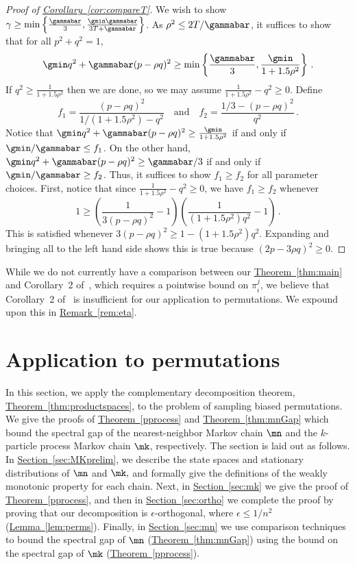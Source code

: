 \documentclass[11pt]{article}
\providecommand{\expref}[2]{\texorpdfstring{\hyperref[#2]{#1~\ref{#2}}}{#1~\ref{#2}}}
\begin{document}
%
%
%
\begin{proof}[Proof of \expref{Corollary}{cor:compareT}]
We wish to show $\gamma\geq \min\left\{\frac{\gammabar}{3}, 
\frac{\gmin\gammabar}{3T+\gammabar}\right\}$. As $\rho^2\leq 
2T/\gammabar$, it suffices to show that for all $p^2+q^2=1$,
 \[\gmin q^2+\gammabar(p-\rho q)^2\geq \min\left\{\frac{\gammabar}{3}, \frac{\gmin}{1+1.5\rho^2}\right\}\,.\]
 If $q^2\geq \frac{1}{1+1.5\rho^2}$ then we are done, so we may assume
 $\frac{1}{1+1.5\rho^2}-q^2\geq 0$.
 Define
  \[f_1=\frac{(p-\rho q)^2}{1/(1+1.5\rho^2) - q^2} \quad \text{and}
  \quad f_2=\frac{1/3 - (p-\rho q)^2}{q^2}\,.\]
 Notice that $\gmin q^2+\gammabar(p-\rho q)^2\geq
 \frac{\gmin}{1+1.5\rho^2}$ if and only if $\gmin/\gammabar\leq f_1$.
 On the other hand, $\gmin q^2+\gammabar(p-\rho q)^2\geq \gammabar/3$ if
 and only if $\gmin/\gammabar\geq f_2$.  Thus, it suffices to show
 $f_1\geq f_2$ for all parameter choices.
First, notice that since $\frac{1}{1+1.5\rho^2}-q^2\geq 0$, we have  $f_1\geq f_2$ whenever
 \[1\geq \left(\frac{1}{3(p-\rho
   q)^2}-1\right)\left(\frac{1}{(1+1.5\rho^2)q^2}-1\right)\,.\]
This is satisfied whenever $3(p-\rho q)^2\geq 1-(1+1.5\rho^2)q^2$.
Expanding and bringing all to the left hand side shows this is true because $(2p-3\rho q)^2\geq 0$.
\end{proof}
%

While we do not currently have a comparison between our
\expref{Theorem}{thm:main} and Corollary~2 of~\cite{jstv04}, which requires
a pointwise bound on $\pi_i^j$, we believe that Corollary~2 of~\cite{jstv04}
is insufficient for our application to permutations.  We expound
upon this in \expref{Remark}{rem:eta}.


\section{Application to permutations}\label{sec:perm}
In this section, we apply the complementary decomposition theorem, 
\expref{Theorem}{thm:productspaces}, to the problem of sampling biased permutations.  
We give the proofs of \expref{Theorem}{pprocess} and \expref{Theorem}{thm:mnGap} which bound the spectral gap of the nearest-neighbor Markov chain $\mn$ and the $k$-particle process Markov chain $\mk$, respectively.  
The section is laid out as follows.  In \expref{Section}{sec:MKprelim}, 
we describe the state spaces and stationary distributions of $\mn$ and $\mk,$ and formally give the definitions of the weakly monotonic 
property for each chain.  Next, in \expref{Section}{sec:mk} we give the proof of 
\expref{Theorem}{pprocess}, and then in \expref{Section}{sec:ortho} we complete the 
proof by proving that our decomposition is 
%
$\epsilon$-orthogonal, where $\epsilon\leq 1/n^2$ %
(\expref{Lemma}{lem:perms}). Finally, in \expref{Section}{sec:mn} we use comparison techniques~\cite{dsc, RT98} to bound the spectral gap of $\mn$ (\expref{Theorem}{thm:mnGap}) using the bound on the spectral gap of $\mk$ (\expref{Theorem}{pprocess}).   
\end{document}
